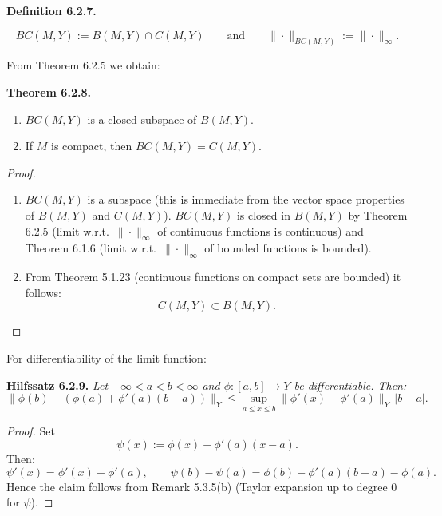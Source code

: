 \documentclass[12pt]{article}
\newenvironment{satz}[1]{%
  \par\vspace{6pt}\noindent\textbf{Theorem #1.}\itshape\space
}{%
  \par\vspace{6pt}
}
\newenvironment{definition}[1]{%
  \par\vspace{6pt}\noindent\textbf{Definition #1.}\itshape\space
}{%
  \par\vspace{6pt}
}
\begin{document}
\begin{definition}{6.2.7}
\[
BC(M,Y):=B(M,Y)\cap C(M,Y)
\qquad\text{and}\qquad
\|\cdot\|_{BC(M,Y)}:=\|\cdot\|_\infty.
\]
\end{definition}

From Theorem 6.2.5 we obtain:

\begin{satz}{6.2.8}
\hfill
\begin{enumerate}
    \item $BC(M,Y)$ is a closed subspace of $B(M,Y)$.
    \item If $M$ is compact, then $BC(M,Y)=C(M,Y)$.
\end{enumerate}
\end{satz}

\begin{proof}
\begin{enumerate}
    \item $BC(M,Y)$ is a subspace (this is immediate from the vector space properties of
    $B(M,Y)$ and $C(M,Y)$).  
    $BC(M,Y)$ is closed in $B(M,Y)$ by Theorem 6.2.5 (limit w.r.t.\ $\|\cdot\|_\infty$ of continuous functions is continuous) and Theorem 6.1.6 (limit w.r.t.\ $\|\cdot\|_\infty$ of bounded functions is bounded).

    \item From Theorem 5.1.23 (continuous functions on compact sets are bounded) it follows:
    \[
    C(M,Y)\subset B(M,Y).
    \]
\end{enumerate}
\end{proof}

\noindent For differentiability of the limit function:

\par\vspace{6pt}\noindent\textbf{Hilfssatz 6.2.9.}\itshape\space
Let $-\infty<a<b<\infty$ and $\phi:[a,b]\to Y$ be differentiable. Then:
\[
\|\phi(b)-(\phi(a)+\phi'(a)(b-a))\|_Y
\le
\sup_{a\le x\le b}\|\phi'(x)-\phi'(a)\|_Y\,|b-a|.
\]
\upshape

\begin{proof}
Set
\[
\psi(x):=\phi(x)-\phi'(a)(x-a).
\]
Then:
\[
\psi'(x)=\phi'(x)-\phi'(a),
\qquad
\psi(b)-\psi(a)=\phi(b)-\phi'(a)(b-a)-\phi(a).
\]
Hence the claim follows from Remark 5.3.5(b) (Taylor expansion up to degree $0$ for $\psi$).
\end{proof}
\end{document}
